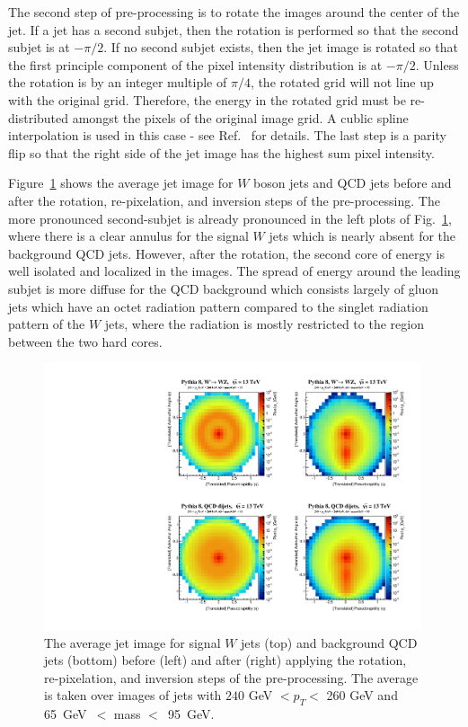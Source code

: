 The second step of pre-processing is to rotate the images around the center of the jet.  If a jet has a second subjet, then the rotation is performed so that the second subjet is at $-\pi/2$.  If no second subjet exists, then the jet image is rotated so that the first principle component of the pixel intensity distribution is at $-\pi/2$.  Unless the rotation is by an integer multiple of $\pi/4$, the rotated grid will not line up with the original grid.  Therefore, the energy in the rotated grid must be re-distributed amongst the pixels of the original image grid.  A cublic spline interpolation is used in this case - see Ref.~\cite{Cogan:2014oua} for details.  The last step is a parity flip so that the right side of the jet image has the highest sum pixel intensity.  

Figure~\ref{fig:preprocess} shows the average jet image for $W$ boson jets and QCD jets before and after the rotation, re-pixelation, and inversion steps of the pre-processing.  The more pronounced second-subjet is already pronounced in the left plots of Fig.~\ref{fig:preprocess}, where there is a clear annulus for the signal $W$ jets which is nearly absent for the background QCD jets.  However, after the rotation, the second core of energy is well isolated and localized in the images.  The spread of energy around the leading subjet is more diffuse for the QCD background which consists largely of gluon jets which have an octet radiation pattern compared to the singlet radiation pattern of the $W$ jets, where the radiation is mostly restricted to the region between the two hard cores.

\begin{figure}[bt]
  \begin{center}
        \includegraphics[width=0.99\textwidth]{figures/Image_mass_average_fixed_nonorm.pdf}
      \caption{ The average jet image for signal $W$ jets (top) and background QCD jets (bottom) before (left) and after (right) applying the rotation, re-pixelation, and inversion steps of the pre-processing.  The average is taken over images of jets with $240$ GeV $<p_T<$ 260 GeV and 65~GeV~$<$ mass $<$~95~GeV.
      \label{fig:preprocess} }
    \end{center}
\end{figure}

